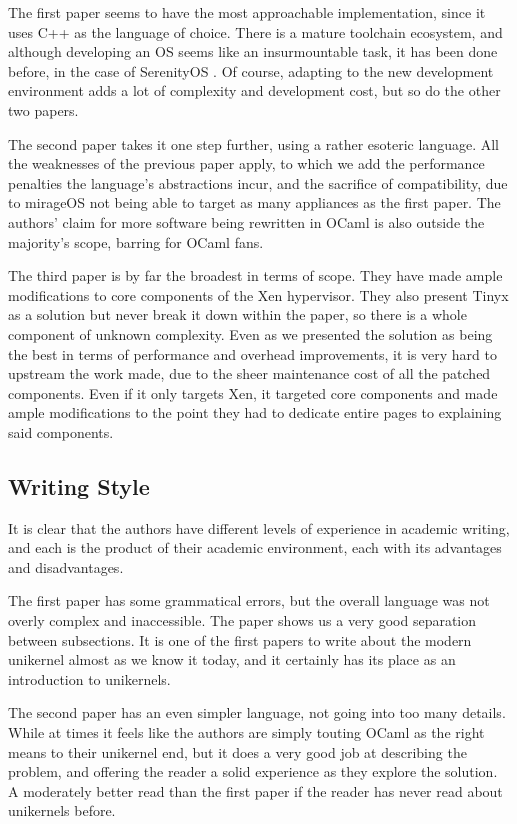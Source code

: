 \documentclass[12pt]{article}
\begin{document}
The first paper seems to have the most approachable implementation, since it uses C++ as the language of choice. There is a mature toolchain
ecosystem, and although developing an OS seems like an insurmountable task, it has been done before, in the case of SerenityOS \cite{SerenityOS}.
Of course, adapting to the new development environment adds a lot of complexity and development cost, but so do the other two papers.

The second paper takes it one step further, using a rather esoteric language. All the weaknesses of the previous paper apply, to which we add the
performance penalties the language's abstractions incur, and the sacrifice of compatibility, due to mirageOS not being able to target as many
appliances as the first paper. The authors' claim for more software being rewritten in OCaml is also outside the majority's scope,
barring for OCaml fans.

The third paper is by far the broadest in terms of scope. They have made ample modifications to core components of the Xen hypervisor.
They also present Tinyx as a solution but never break it down within the paper, so there is a whole component of unknown complexity.
Even as we presented the solution as being the best in terms of performance and overhead improvements, it is very hard to upstream
the work made, due to the sheer maintenance cost of all the patched components. Even if it only targets Xen, it targeted core components
and made ample modifications to the point they had to dedicate entire pages to explaining said components.


\subsection{Writing Style}

It is clear that the authors have different levels of experience in academic writing, and each is the product of their academic environment,
each with its advantages and disadvantages.

The first paper has some grammatical errors, but the overall language was not overly complex and inaccessible. The paper shows us a very good
separation between subsections. It is one of the first papers to write about the modern unikernel almost as we know it today, and it certainly
has its place as an introduction to unikernels.

The second paper has an even simpler language, not going into too many details. While at times it feels like the authors are simply touting OCaml
as the right means to their unikernel end, but it does a very good job at describing the problem, and offering the reader a solid experience as
they explore the solution. A moderately better read than the first paper if the reader has never read about unikernels before.
\end{document}
